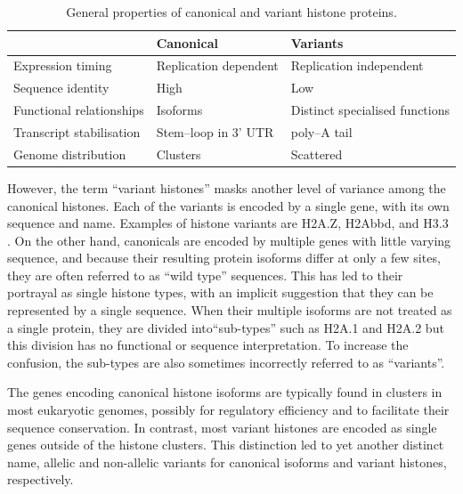 \documentclass[10pt,a4paper,twocolumn,article]{memoir}
\begin{document}
    \begin{table}
      \caption{General properties of canonical and variant histone proteins.}
      \label{tab:typical-histone-differences}
      \centering
      \begin{tabular}{l l l}
        \toprule
        \null                     & Canonical             & Variants \\
        \midrule
        Expression timing         & Replication dependent & Replication independent \\
        Sequence identity         & High                  & Low \\
        Functional relationships  & Isoforms              & Distinct specialised functions \\
        Transcript stabilisation  & Stem--loop in 3' UTR  & poly--A tail \\
        Genome distribution       & Clusters              & Scattered \\
        \bottomrule
      \end{tabular}
    \end{table}

    However, the term ``variant histones'' masks another level of variance among the canonical
    histones. Each of the variants is encoded by a single gene, with its own sequence and
    name. Examples of histone variants are H2A.Z, H2Abbd, and H3.3 \citep{variants-review}.
    On the other hand, canonicals are encoded by multiple genes with little varying sequence,
    and because their resulting protein isoforms differ at only a few sites, they are often
    referred to as ``wild type'' sequences. This has led to their portrayal as single histone
    types, with an implicit suggestion that they can be represented by a single sequence.
    When their multiple isoforms are not treated as a single protein, they are divided
    into``sub-types'' such as H2A.1 and H2A.2 but this division has no functional or sequence
    interpretation. To increase the confusion, the sub-types are also sometimes incorrectly
    referred to as ``variants''.

    The genes encoding canonical histone isoforms are typically found in clusters in most eukaryotic
    genomes, possibly for regulatory efficiency and to facilitate their sequence conservation. In
    contrast, most variant histones are encoded as single genes outside of the histone clusters.
    This distinction led to yet another distinct name, allelic and non-allelic variants for
    canonical isoforms and variant histones, respectively.
\end{document}
